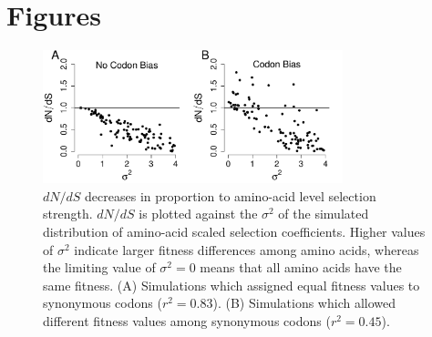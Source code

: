 \documentclass{pnastwo}
\begin{document}
	
\section*{Figures}

\vspace{2cm}
	
\begin{figure}[htbp]
	\centerline{\includegraphics[width=8.7cm]{figures/MainText/sd_vs_dnds.pdf}}
	\caption{\label{stddev_dnds} $dN/dS$ decreases in proportion to amino-acid level selection strength. $dN/dS$ is plotted against the $\sigma^2 $ of the simulated distribution of amino-acid scaled selection coefficients. Higher values of $\sigma^2$ indicate larger fitness differences among amino acids, whereas the limiting value of $\sigma^2 = 0$ means that all amino acids have the same fitness. (A) Simulations which assigned equal fitness values to synonymous codons ($r^2=0.83$). (B) Simulations which allowed different fitness values among synonymous codons ($r^2=0.45$).}
\end{figure}
		
		
\vspace{2cm}
		
\end{document}
